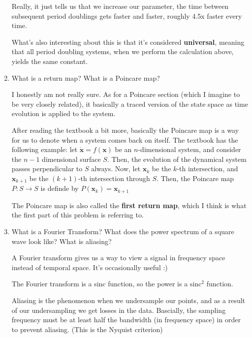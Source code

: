\documentclass[10pt]{article}
\begin{document}
\begin{enumerate}[label=\arabic*.]
\begin{solution}
			Really, it just tells us that we increase our parameter, 
			the time between subsequent period doublings gets faster and 
			faster, roughly 4.5x faster every time.  

			What's also interesting about this is that it's considered 
			\textbf{universal}, meaning that all period doubling systems, when 
			we perform the calculation above, yields the same constant. 
		\end{solution}
	\item What is a return map? What is a Poincare map? 

		\begin{solution}
			I honestly am not really sure. As for a Poincare section (which I imagine 
			to be very closely related), it basically a traced version of the 
			state space as time evolution is applied to the system. 


			After reading the textbook a bit more, basically the Poincare map 
			is a way for us to denote when a system comes back on itself. The textbook 
			has the following example: let \( \dot{\mathbf{x}} = f(\mathbf{x}) \) be 
			an \( n \)-dimensional system, and consider the \( n-1 \) dimensional 
			surface \( S \). Then, the evolution of the dynamical system passes
			perpendicular to \( S \) always. Now, let \( \mathbf{x}_k \) be the 
			\( k \)-th intersection, and \( \mathbf{x}_{k + 1} \) be the 
			\( (k + 1) \)-th intersection through \( S \). Then, the Poincare 
			map \( P: S \to S \) is definde by \( P(\mathbf{x}_k) = 
			\mathbf{x}_{k + 1}\)

			The Poincare map is also called the \textbf{first return map}, which 
			I think is what the first part of this problem is referring to. 
		\end{solution}
	\item What is a Fourier Transform? What does the power spectrum of a square 
		wave look like? What is aliasing?

		\begin{solution}
			A Fourier transform gives us a way to view a signal in frequency space 
			instead of temporal space. It's occasionally useful :)

			The Fourier transform is a sinc function, so the 
			power is a \( \mathrm{sinc}^2 \) function.

			Aliasing is the phenomenon when we undersample our points, and as a result 
			of our undersampling we get losses in the data. Bascially, the sampling 
			frequency must be at least half the bandwidth (in frequency space) 
			in order to prevent aliasing. (This is the Nyquist criterion) 
		\end{solution}
\end{enumerate}
\end{document}
